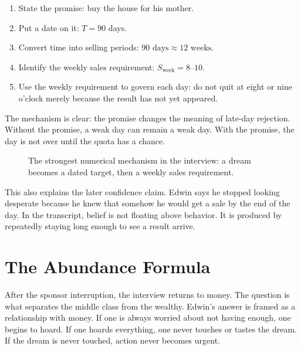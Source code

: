 \begin{enumerate}
\item State the promise: buy the house for his mother.
\item Put a date on it: \(T=90\) days.
\item Convert time into selling periods: \(90\text{ days}\approx 12\text{ weeks}\).
\item Identify the weekly sales requirement: \(S_{\text{week}}=8\text{--}10\).
\item Use the weekly requirement to govern each day: do not quit at eight or nine o'clock merely because the result has not yet appeared.
\end{enumerate}

The mechanism is clear: the promise changes the meaning of late-day rejection. Without the promise, a weak day can remain a weak day. With the promise, the day is not over until the quota has a chance.

\begin{figure}
\centering
{}
\caption{The strongest numerical mechanism in the interview: a dream becomes a dated target, then a weekly sales requirement.}
\end{figure}

This also explains the later confidence claim. Edwin says he stopped looking desperate because he knew that somehow he would get a sale by the end of the day. In the transcript, belief is not floating above behavior. It is produced by repeatedly staying long enough to see a result arrive.

\section{The Abundance Formula}

After the sponsor interruption, the interview returns to money. The question is what separates the middle class from the wealthy. Edwin's answer is framed as a relationship with money. If one is always worried about not having enough, one begins to hoard. If one hoards everything, one never touches or tastes the dream. If the dream is never touched, action never becomes urgent.

